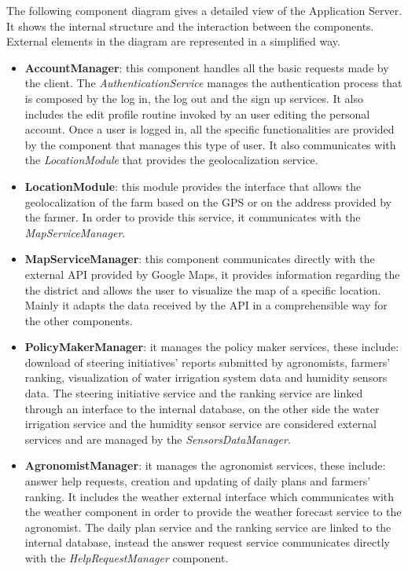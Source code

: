 \documentclass[table, 12pt]{article}
\begin{document}
The following component diagram gives a detailed view of the Application Server. It shows the internal structure and the interaction between the components.
External elements in the diagram are represented in a simplified way.
\begin{itemize}
    \item \textbf{AccountManager}: this component handles all the basic requests made by the client.
    The \textit{AuthenticationService} manages the authentication process that is composed by the log in, the log out and the sign up services. 
    It also includes the edit profile routine invoked by an user editing the personal account.
    Once a user is logged in, all the specific functionalities are provided by the component that manages this type of user.
    It also communicates with the \textit{LocationModule} that provides the geolocalization service.
    \item \textbf{LocationModule}: this module provides the interface that allows the geolocalization of the farm based on the GPS or on the address provided by the farmer.
    In order to provide this service, it communicates with the \textit{MapServiceManager}.
    \item \textbf{MapServiceManager}: this component communicates directly with the external API provided by Google Maps, it provides information regarding the the district and allows the user to visualize the map of a specific location.
    Mainly it adapts the data received by the API in a comprehensible way for the other components.
    \item \textbf{PolicyMakerManager}: it manages the policy maker services, these include: download of steering initiatives' reports submitted by agronomists, farmers' ranking, visualization of water irrigation system data and humidity sensors data.
    The steering initiative service and the ranking service are linked through an interface to the internal database, on the other side the water irrigation service and the humidity sensor service are considered external services and are managed by the \textit{SensorsDataManager}.
    \item \textbf{AgronomistManager}: it manages the agronomist services, these include: answer help requests, creation and updating of daily plans and farmers' ranking.
    It includes the weather external interface which communicates with the weather component in order to provide the weather forecast service to the agronomist.
    The daily plan service and the ranking service are linked to the internal database, instead the answer request service communicates directly with the \textit{HelpRequestManager} component.

\end{itemize}
\end{document}
